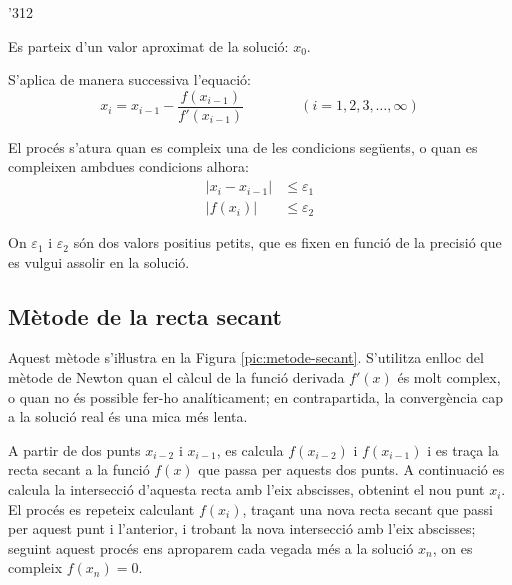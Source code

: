 \begin{dingautolist}{'312}
    \item Es parteix d'un valor aproximat de la solució: $x_0$.

    \item   S'aplica de manera successiva l'equació:
            \begin{equation}\label{eq:newton}
              x_i = x_{i-1} - \frac{f(x_{i-1})}{f'(x_{i-1})} \qquad\qquad (i=1,2,3,\dots,\infty)
            \end{equation}

    \item   El procés s'atura quan es compleix una de les condicions següents, o quan es compleixen ambdues condicions alhora:
            \begin{subequations}\begin{align}
              |x_i - x_{i-1}| &\leq \varepsilon_1 \\
              |f(x_i)| &\leq \varepsilon_2
            \end{align}\end{subequations}

            On $\varepsilon_1$ i $\varepsilon_2$ són dos valors positius petits, que es fixen en funció de la precisió que es vulgui assolir en la solució.
\end{dingautolist}



\subsection{Mètode de la recta secant}

Aquest mètode s'iŀlustra en la Figura \vref{pic:metode-secant}. S'utilitza enlloc del mètode de Newton quan el càlcul de  la funció derivada $f'(x)$ és molt complex, o quan no és possible fer-ho analíticament; en contrapartida, la convergència cap a la solució real és una
mica més lenta.


\begin{center}
    
    \label{pic:metode-secant}
\end{center}


A partir de dos punts $x_{i-2}$ i $x_{i-1}$, es calcula $f(x_{i-2})$ i $f(x_{i-1})$ i es traça la recta secant a la funció $f(x)$ que passa per aquests dos punts. A continuació es calcula la intersecció d'aquesta recta amb l'eix abscisses, obtenint el nou punt $x_i$. El procés es repeteix calculant $f(x_i)$, traçant una nova recta secant que passi per aquest punt i l'anterior, i trobant la nova intersecció amb l'eix abscisses; seguint aquest procés ens aproparem cada vegada més a la solució $x_n$, on es compleix $f(x_n)=0$.

